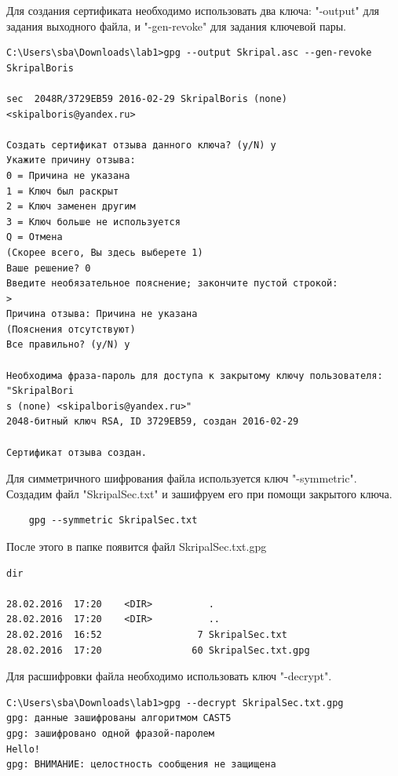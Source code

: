 \documentclass[10pt,a4paper]{report}
\begin{document}
Для создания сертификата необходимо использовать два ключа: "\--output" для задания выходного файла, и "\--gen-revoke" для задания ключевой пары.

\begin{verbatim}
C:\Users\sba\Downloads\lab1>gpg --output Skripal.asc --gen-revoke SkripalBoris

sec  2048R/3729EB59 2016-02-29 SkripalBoris (none) <skipalboris@yandex.ru>

Создать сертификат отзыва данного ключа? (y/N) y
Укажите причину отзыва:
0 = Причина не указана
1 = Ключ был раскрыт
2 = Ключ заменен другим
3 = Ключ больше не используется
Q = Отмена
(Скорее всего, Вы здесь выберете 1)
Ваше решение? 0
Введите необязательное пояснение; закончите пустой строкой:
>
Причина отзыва: Причина не указана
(Пояснения отсутствуют)
Все правильно? (y/N) y

Необходима фраза-пароль для доступа к закрытому ключу пользователя: "SkripalBori
s (none) <skipalboris@yandex.ru>"
2048-битный ключ RSA, ID 3729EB59, создан 2016-02-29

Сертификат отзыва создан.
\end{verbatim}

Для симметричного шифрования файла используется ключ "\--symmetric". Создадим файл "SkripalSec.txt" и зашифруем его при помощи закрытого ключа.

\begin{verbatim}
	gpg --symmetric SkripalSec.txt
\end{verbatim}

После этого в папке появится файл SkripalSec.txt.gpg

\begin{verbatim}
dir

28.02.2016  17:20    <DIR>          .
28.02.2016  17:20    <DIR>          ..
28.02.2016  16:52                 7 SkripalSec.txt
28.02.2016  17:20                60 SkripalSec.txt.gpg
\end{verbatim}

Для расшифровки файла необходимо использовать ключ "\--decrypt".

\begin{verbatim}
C:\Users\sba\Downloads\lab1>gpg --decrypt SkripalSec.txt.gpg
gpg: данные зашифрованы алгоритмом CAST5
gpg: зашифровано одной фразой-паролем
Hello!
gpg: ВНИМАНИЕ: целостность сообщения не защищена
\end{verbatim}
	
\end{document}
